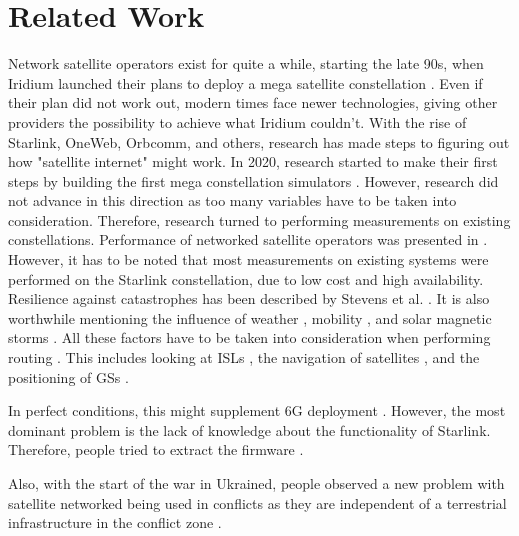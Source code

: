 \section{Related Work} \label{sec:related-work}

Network satellite operators exist for quite a while, starting the late 90s,
when Iridium launched their plans to deploy a mega satellite constellation
\cite{Chan2002}. Even if their plan did not work out, modern times face newer
technologies, giving other providers the possibility to achieve what Iridium
couldn't. With the rise of Starlink, OneWeb, Orbcomm, and others, research has
made steps to figuring out how "satellite internet" might work. In 2020,
research started to make their first steps by building the first mega
constellation simulators \cite{DBLP:conf/icnp/LaiLL20,
	DBLP:conf/imc/KassingBASS20}. However, research did not advance in this
direction as too many variables have to be taken into consideration. Therefore,
research turned to performing measurements on existing constellations.
Performance of networked satellite operators was presented in \cite{Segan2020, DBLP:conf/infocom/MaCZCML23,
	Pekhterev2021, DBLP:journals/pacmnet/RamanVCSZ23, DBLP:conf/leo-net/0001SCB23,
	DBLP:conf/imc/MichelTGB22, DBLP:conf/www/MohanFCBRMO24, Izhikevich2024,
	Omorogiuwa2024}.
However, it has to be noted that most measurements on existing systems were
performed on the Starlink constellation, due to low cost and high availability.
Resilience against catastrophes has been described by Stevens et al. \cite{DBLP:conf/pam/StevensIBD24}.
It is also worthwhile mentioning the influence of weather
\cite{DBLP:conf/tma/LaniewskiLMRA24, }, mobility
\cite{DBLP:journals/corr/abs-2403-13497}, and solar magnetic storms
\cite{DBLP:conf/infocom/MaCZCML23, Fang2022, Hapgood2022}. All these factors
have to be taken into consideration when performing routing
\cite{DBLP:conf/hotnets/Handley18, DBLP:journals/comcom/ZhangY22,
	DBLP:conf/pam/BhosaleSBG23}. This includes looking at \ac{ISLs}
\cite{DBLP:conf/hotnets/HauriBGS20, Stock2022}, the navigation of satellites
\cite{DBLP:conf/plans/KassasKKSHNKK23,DBLP:conf/iotbd/ShortenKR24}, and the positioning of \ac{GS}s \cite{DBLP:conf/sigcomm/VasishtSC21}.

In perfect conditions, this might supplement 6G deployment
\cite{DBLP:journals/cm/LinCCCHB21}. However, the most dominant problem is the
lack of knowledge about the functionality of Starlink. Therefore, people tried
to extract the firmware \cite{WoutersDumpingUserTerminalFirmware,
	QuarkslabsBlogUserTerminalFirmsware}.

Also, with the start of the war in Ukrained, people observed a new problem with
satellite networked being used in conflicts as they are independent of a
terrestrial infrastructure in the conflict zone \cite{Lab2024, Walsh2024,
	Abels2024}.
